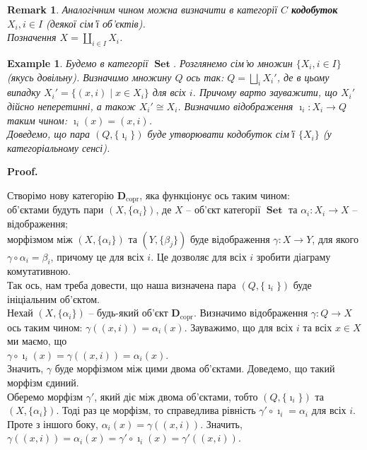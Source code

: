 \documentclass[a4paper, 10pt]{article}
\makeatletter
\theoremstyle{theoremdd}
\newtheorem{example}[theorem]{Example}
\newtheorem{remark}[theorem]{Remark}
\renewenvironment{proof}[1][Proof.\\]{\par
\pushQED{\hfill \qed}%
\normalfont \topsep6\p@\@plus6\p@\relax
\trivlist
\item\relax
{\bfseries
#1\@addpunct{.}}\hspace\labelsep\ignorespaces
}{%
\popQED\endtrivlist\@endpefalse
}
\DeclareMathOperator{\Set}{\textbf{Set}}
\makeatother
\begin{document}
\begin{remark}
Аналогічним чином можна визначити в категорії $C$ \textbf{кодобуток $X_i, i \in I$} (деякої сім'ї об'єктів).\\
Позначення $X = \displaystyle\coprod_{i \in I} X_i$.
\end{remark}

\begin{example}
Будемо в категорії $\Set$. Розглянемо сім'ю множин $\{X_i, i \in I\}$ (якусь довільну). Визначимо множину $Q$ ось так: $Q = \displaystyle\bigsqcup_{i} X_i'$, де в цьому випадку $X_i' = \{(x,i) \mid x \in X_i\}$ для всіх $i$. Причому варто зауважити, що $X_i'$ дійсно неперетинні, а також $X_i' \cong X_i$. Визначимо відображення $\imath_i \colon X_i \to Q$ таким чином: $\imath_i(x) = (x,i)$.\\
Доведемо, що пара $(Q,\{\imath_i\})$ буде утворювати кодобуток сім'ї $\{X_i\}$ (у категоріальному сенсі).
\end{example}

\begin{proof}
Створімо нову категорію $\textbf{D}_{\text{copr}}$, яка функціонує ось таким чином:\\
об'єктами будуть пари $(X,\{\alpha_i\})$, де $X$ -- об'єкт категорії $\Set$ та $\alpha_i \colon X_i \to X$ -- відображення;\\
морфізмом між $(X,\{\alpha_i\})$ та $(Y,\{\beta_j\})$ буде відображення $\gamma \colon X \to Y$, для якого $\gamma \circ \alpha_i = \beta_i$, причому це для всіх $i$. Це дозволяє для всіх $i$ зробити діаграму комутативною.\\
Так ось, нам треба довести, що наша визначена пара $(Q,\{\imath_i\})$ буде ініціальним об'єктом.\\
Нехай $(X,\{\alpha_i\})$ -- будь-який об'єкт $\textbf{D}_{\text{copr}}$. Визначимо відображення $\gamma \colon Q \to X$ ось таким чином: $\gamma((x,i)) = \alpha_i(x)$. Зауважимо, що для всіх $i$ та всіх $x \in X$ ми маємо, що\\
$\gamma \circ \imath_i(x) = \gamma((x,i)) = \alpha_i(x)$.\\
Значить, $\gamma$ буде морфізмом між цими двома об'єктами. Доведемо, що такий морфізм єдиний.\\
Оберемо морфізм $\gamma'$, який діє між двома об'єктами, тобто $(Q,\{\imath_i\})$ та $(X,\{\alpha_i\})$. Тоді раз це морфізм, то справедлива рівність $\gamma' \circ \imath_i = \alpha_i$ для всіх $i$. Проте з іншого боку, $\alpha_i(x) = \gamma((x,i))$. Значить, $\gamma((x,i)) = \alpha_i(x) = \gamma' \circ \imath_i (x) = \gamma'((x,i))$.
\end{proof}
\end{document}
